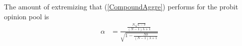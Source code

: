 \documentclass[11pt]{article}
\theoremstyle{definition}
\theoremstyle{definition}
\begin{document}
The amount of extremizing that (\ref{CompoundAggre}) performs for the probit opinion pool is
\begin{align}
\alpha &= \frac{\frac{N\sqrt{1-\delta}}{(N-1)\lambda +1}}{\sqrt{1- \frac{N\delta}{(N-1)\lambda +1} }} \label{CompoundAlpha}
\end{align}
\end{document}
